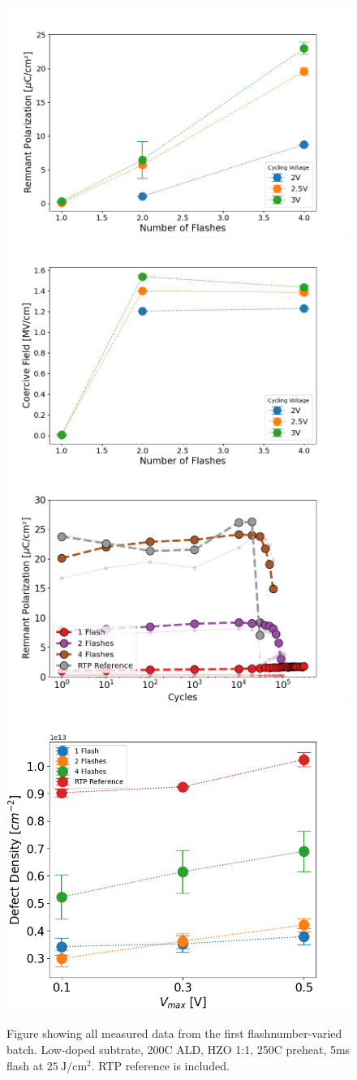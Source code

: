 \documentclass[11pt]{article}
\begin{document}
    \begin{figure}[ht!]
        \centering
        \includegraphics[width=.48\textwidth]{../Fig/InAsFlashNumA/PrTrends_FlashNumA.png}
        \includegraphics[width=.48\textwidth]{../Fig/InAsFlashNumA/EcTrends_FlashNumA.png}
        \includegraphics[width=.48\textwidth]{../Fig/InAsFlashNumA/EnduSpaghetti_FlashNumA.png}
        \includegraphics[width=.48\textwidth]{../Fig/InAsFlashNumA/DDTrend_FlashNumA.png}
        \caption{Figure showing all measured data from the first flashnumber-varied batch. Low-doped subtrate, 200C ALD, HZO 1:1, 250C preheat, 5ms flash at $\SI{25}{\joule/\centi\meter^2}$. RTP reference is included.}\label{fig:res_FlashNumA}
    \end{figure}
\end{document}
